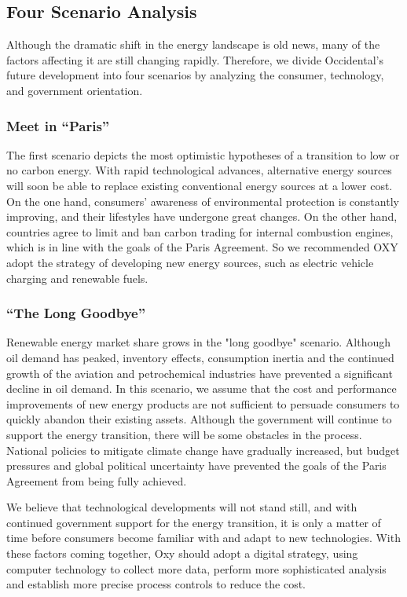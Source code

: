 \documentclass[
	a4paper, %
	12pt,%
]{CSSullivanBusinessReport}
\begin{document}
\begin{fullwidth}
\subsection{Four Scenario Analysis}
Although the dramatic shift in the energy landscape is old news, many of the factors affecting it are still changing rapidly. Therefore, we divide Occidental's future development into four scenarios by analyzing the consumer, technology, and government orientation.
\subsubsection{Meet in “Paris”}
The first scenario depicts the most optimistic hypotheses of a transition to low or no carbon energy. With rapid technological advances, alternative energy sources will soon be able to replace existing conventional energy sources at a lower cost. On the one hand, consumers' awareness of environmental protection is constantly improving, and their lifestyles have undergone great changes. On the other hand, countries agree to limit and ban carbon trading for internal combustion engines, which is in line with the goals of the Paris Agreement. So we recommended OXY adopt the strategy of developing new energy sources, such as electric vehicle charging and renewable fuels.
\subsubsection{“The Long Goodbye”}
Renewable energy market share grows in the "long goodbye" scenario. Although oil demand has peaked, inventory effects, consumption inertia and the continued growth of the aviation and petrochemical industries have prevented a significant decline in oil demand. In this scenario, we assume that the cost and performance improvements of new energy products are not sufficient to persuade consumers to quickly abandon their existing assets. Although the government will continue to support the energy transition, there will be some obstacles in the process. National policies to mitigate climate change have gradually increased, but budget pressures and global political uncertainty have prevented the goals of the Paris Agreement from being fully achieved.\par
We believe that technological developments will not stand still, and with continued government support for the energy transition, it is only a matter of time before consumers become familiar with and adapt to new technologies. With these factors coming together, Oxy should adopt a digital strategy, using computer technology to collect more data, perform more sophisticated analysis and establish more precise process controls to reduce the cost.

\end{fullwidth}
\end{document}

